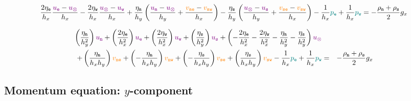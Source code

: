{\footnotesize
\[
\frac{2\eta_{\tt e}}{h_x}    
\frac{{\color{violet} u_{\tt e}}-{\color{violet} u_\otimes}}{h_x} 
-  \frac{2\eta_{\tt w}}{h_x} \frac{{\color{violet} u_\otimes}-{\color{violet} u_{\tt w}}}{h_x}
+ \frac{\eta_{\tt n}}{h_y}  
 \left( \frac{{\color{violet} u_{\tt n}}-{\color{violet} u_\otimes}}{h_y} +\frac{{\color{orange} v_{\tt ne}}-{\color{orange} v_{\tt nw}}}{h_x} \right)
- \frac{\eta_{\tt s}}{h_y} 
 \left( \frac{{\color{violet} u_\otimes}-{\color{violet} u_{\tt s}}}{h_y} +\frac{{\color{orange} v_{\tt se}}-{\color{orange} v_{\tt sw}}}{h_x} \right) 
-\frac{1}{h_x} {\color{teal}p_{\tt e}} + \frac{1}{h_x} {\color{teal}p_{\tt w}}
= -\frac{\rho_{\tt n}+\rho_{\tt s}}{2} g_x
\]
}


\begin{mdframed}[backgroundcolor=blue!5]
\begin{eqnarray}
\left( \frac{\eta_{\tt n}}{h_y^2} \right) {\color{violet} u_{\tt n}} + 
\left( \frac{2\eta_{\tt e}}{h_x^2} \right) {\color{violet} u_{\tt e}} + 
\left( \frac{2\eta_{\tt w}}{h_x^2} \right) {\color{violet} u_{\tt w}} + 
\left( \frac{\eta_{\tt s}}{h_y^2} \right) {\color{violet} u_{\tt s}} + 
\left( -\frac{2\eta_{\tt e}}{h_x^2} -\frac{2\eta_{\tt w}}{h_x^2}  
-\frac{\eta_{\tt n}}{h_y^2} -\frac{\eta_{\tt s}}{h_y^2}  
\right) {\color{violet} u_\otimes} \nonumber\\
+
\left( \frac{\eta_{\tt n}}{h_x h_y} \right) {\color{orange} v_{\tt ne}}+ 
\left(-\frac{\eta_{\tt n}}{h_x h_y} \right) {\color{orange} v_{\tt nw}}+ 
\left(-\frac{\eta_{\tt s}}{h_x h_y} \right) {\color{orange} v_{\tt se}}+ 
\left( \frac{\eta_{\tt s}}{h_x h_y} \right) {\color{orange} v_{\tt sw}} 
- \frac{1}{h_x} {\color{teal}p_{\tt e}} + \frac{1}{h_x} {\color{teal}p_{\tt w}} 
&=& -\frac{\rho_{\tt n}+\rho_{\tt s}}{2} g_x \nonumber\\
\label{eq:fdmstokes1}
\end{eqnarray}
\end{mdframed}




\newpage
\subsection{Momentum equation: $y$-component}

